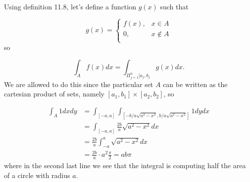 
Using definition 11.8, let's define a function $ g(x)$ such that

\[
    g(x) = \begin{cases}
	f(x), & x\in A \\
	0, & x \notin A\\
    \end{cases}
\] 
so 

\[
    \int_{A}^{} f(x) dx = \int_{\Pi_{j=1}^{n} [a_{j} , b_{j} }^{} g(x) dx
.\] 
We are allowed to do this since the particular set $ A $ can be written as the cartesian product of
sets, namely $ [a_{1}, b_1] \times [a_2, b_2] $, so 

\begin{align*}
    \int_{A}^{} 1 dx dy &= \int_{[-a, a]}^{} \int_{[-b/a \sqrt{a^2-x^2}, b/a \sqrt{a^2 - x^2}]}^{} 1
    dy dx\\
			&= \int_{[-a,a]}^{} \frac{2b}{a} \sqrt{a^2 - x^2} dx\\
			&= \frac{2b}{a} \int_{-a}^{a} \sqrt{a^2-x^2} dx\\
			&= \frac{2b}{a} \cdot a^2 \frac{\pi}{2} = ab \pi
\end{align*}
where in the second last line we see that the integral is computing half the area of a circle with
radius $ a$.

